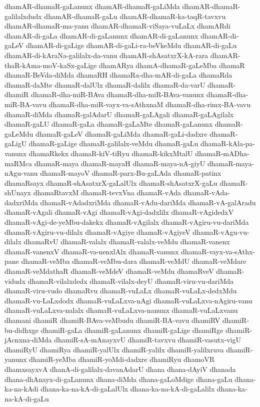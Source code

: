 {dhamAR-dhamaR-gaLanunx
dhamAR-dhamaR-gaLiMda
dhamAR-dhamaR-galilalxdudx
dhamAR-dhamaR-gaLu
dhamAR-dhamaR-ka-taqR-tavxvu
dhamAR-dhamaR-ma-yanu
dhamAR-dhamaR-viSaya-vuLaLx
dhamARdi
dhamAR-di-gaLa
dhamAR-di-gaLanunx
dhamAR-di-gaLanunx
dhamAR-di-gaLeV
dhamAR-di-gaLige
dhamAR-di-gaLi-ra-beVkeMdu
dhamAR-di-gaLu
dhamAR-di-kAraNa-galilalx-da-vanu
dhamAR-shAsatxrX-kA-rara
dhamAR-thaR-kAma-moV-kaSx-gaLige
dhamARya
dhamA-dhamaR-gaLeMba
dhamaR
dhamaR-BeVda-diMda
dhamaRH
dhamaRa-dha-mAR-di-gaLa
dhamaRda
dhamaR-daMte
dhamaR-dalUlx
dhamaR-dalilx
dhamaR-da-varU
dhamaR-dhamiR
dhamaR-dha-miR-BAva
dhamaR-dha-miR-BAva-vanunx
dhamaR-dha-miR-BA-vavu
dhamaR-dha-miR-vayx-va-sAthxnaM
dhamaR-dha-rimx-BA-vavu
dhamaR-diMda
dhamaR-galAdarU
dhamaR-gaLAgali
dhamaR-gaLAgilalx
dhamaR-gaLU
dhamaR-gaLa
dhamaR-gaLaMte
dhamaR-gaLanunx
dhamaR-gaLeMdu
dhamaR-gaLeV
dhamaR-gaLiMda
dhamaR-gaLi-dadxre
dhamaR-gaLigU
dhamaR-gaLige
dhamaR-galilalx-veMdu
dhamaR-gaLu
dhamaR-kAla-pa-vanunx
dhamaRkekx
dhamaR-kiV-tiRyu
dhamaR-kikxMtalU
dhamaR-mADha-maRMca
dhamaR-maya
dhamaR-mayaH
dhamaR-maya-nA-giyU
dhamaR-maya-nAgu-vanu
dhamaR-mayoV
dhamaR-parx-Bu-gaLAda
dhamaR-patinx
dhamaRsayx
dhamaR-shAsatxrX-gaLalUlx
dhamaR-shAsatxrX-gaLu
dhamaR-shUnayx
dhamaRtavxM
dhamaR-tevxVna
dhamaR-vAda
dhamaR-vAda-dadxriMda
dhamaR-vAdadxriMda
dhamaR-vAdu-dariMda
dhamaR-vA-galAradu
dhamaR-vAgali
dhamaR-vAgi
dhamaR-vAgi-dadxlilx
dhamaR-vAgidedxV
dhamaR-vAgi-de-yeMbu-dakekx
dhamaR-vAgilalx
dhamaR-vAgiru-vu-dariMda
dhamaR-vAgiru-vu-dilalx
dhamaR-vAgiye
dhamaR-vAgiyeV
dhamaR-vAgu-vu-dilalx
dhamaRvU
dhamaR-valalx
dhamaR-valalx-veMdu
dhamaR-vanenx
dhamaR-vanenxV
dhamaR-va-nenxlAlx
dhamaR-vanunx
dhamaR-vayx-va-sAthx-pane
dhamaR-veMba
dhamaR-veMbu-dara
dhamaR-veMdU
dhamaR-veMdare
dhamaR-veMdathaR
dhamaR-veMdeV
dhamaR-veMdu
dhamaRveV
dhamaR-vidudx
dhamaR-vilalxdedx
dhamaR-vilalx-deyU
dhamaR-viru-vu-dariMda
dhamaR-viru-vudo
dhamaRvu
dhamaR-vuLaLx
dhamaR-vuLaLx-dedxMdu
dhamaR-vu-LaLxdodx
dhamaR-vuLaLxva-nAgi
dhamaR-vuLaLxva-nAgiru-vanu
dhamaR-vuLaLxva-nalalx
dhamaR-vuLaLxva-nanunx
dhamaR-vuLaLxvanu
dhamani
dhamiR
dhamiR-BAva-veMbudu
dhamiR-BA-vavu
dhamiRV
dhamiR-bu-didhxge
dhamiR-gaLa
dhamiR-gaLanunx
dhamiR-gaLige
dhamiRge
dhamiR-jAcnxna-diMda
dhamiR-sA-mAnayxvU
dhamiR-tavxvu
dhamiR-vasutx-vigU
dhamiRyU
dhamiRya
dhamiR-yalUlx
dhamiR-yalilx
dhamiR-yalilxruva
dhamiR-yanunx
dhamiR-yeMba
dhamiR-yoMdi-dadxre
dhamiRyu
dhamoVR
dhamxsayxvA
dhanA-di-galilalx-davanAdarU
dhana
dhana-dAyiV
dhanada
dhana-dhAnayx-di-gaLanunx
dhana-diMda
dhana-gaLoMdige
dhana-gaLu
dhana-ka-na-kAdi
dhana-ka-na-kA-di-gaLalUlx
dhana-ka-na-kA-di-gaLalilx
dhana-ka-na-kA-di-gaLu
}

